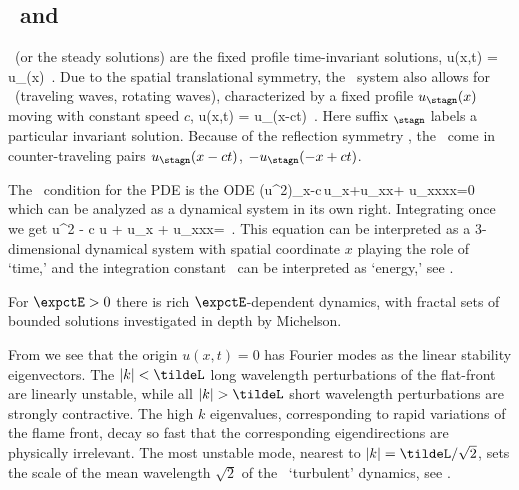 

\subsection{\Eqva\ and \reqva}
\label{sec:stks}

\Eqva\  (or the steady solutions)
are the fixed profile time-invariant solutions,
\beq
 u(x,t) = u_\stagn(x)
\,.
Due to the spatial translational symmetry,
the \KS\ system also allows for
\reqva\ (traveling waves, rotating waves),
characterized by a fixed profile $u_\stagn(x)$
moving with constant speed $c$, {\ie}
\beq
 u(x,t) =  u_\stagn(x-ct)
\,.
Here suffix ${}_\stagn$ labels a particular invariant solution.
Because of the reflection symmetry ,
the \reqva\ come in counter-traveling pairs
$u_\stagn(x-ct)$, $-u_\stagn(-x+ct)$.

The \reqv\ condition for the {\KS} PDE  is the ODE
\beq
{\textstyle{}}(u^2)_x-c\,u_x+u_{xx}+ u_{xxxx}=0
which can be analyzed as a dynamical system in its own right.
Integrating once we get
\beq
{\textstyle{}}u^2 - c u + u_x + u_{xxx}=\expctE
\,.
\label{eq:stdks}
\eeq
This equation can be interpreted as a 3-dimen\-si\-on\-al dynamical system
with spatial coordinate $x$ playing the role of `time,'
and the integration constant \expctE\ can be interpreted as `energy,'
see .

For $\expctE>0$ there is rich $\expctE$-dependent dynamics,
with fractal sets of bounded solutions investigated in depth
by Michelson.

From  we see that the origin $u(x,t) = 0$
has Fourier modes as the linear stability eigenvectors.  The $|k|<\tildeL$
long wavelength perturbations of the flat-front {\eqv}
are linearly unstable, while all
$|k|> \tildeL$ short wavelength perturbations are strongly contractive.
The high $k$ eigenvalues, corresponding to rapid variations of
the flame front, decay so fast that the corresponding eigendirections
are physically irrelevant.
The most unstable mode, nearest to $|k|=\tildeL/\sqrt{2}$,
sets the scale of the mean wavelength $\sqrt{2}$
of the \KS\ `turbulent' dynamics,
see .


